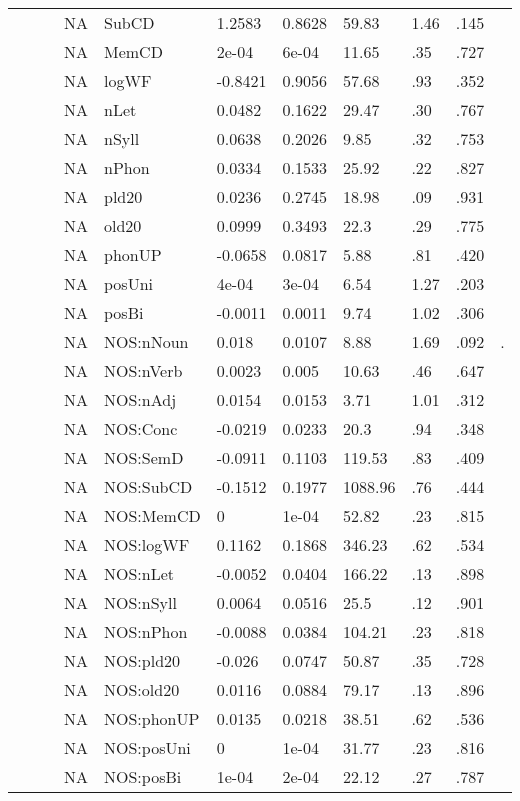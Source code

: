 \begin{table}[ht]
\begin{tabular}{lllllllllll}
   &  &  & NA & SubCD & 1.2583 & 0.8628 & 59.83 & 1.46 & .145 &   \\ 
   &  &  & NA & MemCD & 2e-04 & 6e-04 & 11.65 & .35 & .727 &   \\ 
   &  &  & NA & logWF & -0.8421 & 0.9056 & 57.68 & .93 & .352 &   \\ 
   &  &  & NA & nLet & 0.0482 & 0.1622 & 29.47 & .30 & .767 &   \\ 
   &  &  & NA & nSyll & 0.0638 & 0.2026 & 9.85 & .32 & .753 &   \\ 
   &  &  & NA & nPhon & 0.0334 & 0.1533 & 25.92 & .22 & .827 &   \\ 
   &  &  & NA & pld20 & 0.0236 & 0.2745 & 18.98 & .09 & .931 &   \\ 
   &  &  & NA & old20 & 0.0999 & 0.3493 & 22.3 & .29 & .775 &   \\ 
   &  &  & NA & phonUP & -0.0658 & 0.0817 & 5.88 & .81 & .420 &   \\ 
   &  &  & NA & posUni & 4e-04 & 3e-04 & 6.54 & 1.27 & .203 &   \\ 
   &  &  & NA & posBi & -0.0011 & 0.0011 & 9.74 & 1.02 & .306 &   \\ 
   &  &  & NA & NOS:nNoun & 0.018 & 0.0107 & 8.88 & 1.69 & .092 & . \\ 
   &  &  & NA & NOS:nVerb & 0.0023 & 0.005 & 10.63 & .46 & .647 &   \\ 
   &  &  & NA & NOS:nAdj & 0.0154 & 0.0153 & 3.71 & 1.01 & .312 &   \\ 
   &  &  & NA & NOS:Conc & -0.0219 & 0.0233 & 20.3 & .94 & .348 &   \\ 
   &  &  & NA & NOS:SemD & -0.0911 & 0.1103 & 119.53 & .83 & .409 &   \\ 
   &  &  & NA & NOS:SubCD & -0.1512 & 0.1977 & 1088.96 & .76 & .444 &   \\ 
   &  &  & NA & NOS:MemCD & 0 & 1e-04 & 52.82 & .23 & .815 &   \\ 
   &  &  & NA & NOS:logWF & 0.1162 & 0.1868 & 346.23 & .62 & .534 &   \\ 
   &  &  & NA & NOS:nLet & -0.0052 & 0.0404 & 166.22 & .13 & .898 &   \\ 
   &  &  & NA & NOS:nSyll & 0.0064 & 0.0516 & 25.5 & .12 & .901 &   \\ 
   &  &  & NA & NOS:nPhon & -0.0088 & 0.0384 & 104.21 & .23 & .818 &   \\ 
   &  &  & NA & NOS:pld20 & -0.026 & 0.0747 & 50.87 & .35 & .728 &   \\ 
   &  &  & NA & NOS:old20 & 0.0116 & 0.0884 & 79.17 & .13 & .896 &   \\ 
   &  &  & NA & NOS:phonUP & 0.0135 & 0.0218 & 38.51 & .62 & .536 &   \\ 
   &  &  & NA & NOS:posUni & 0 & 1e-04 & 31.77 & .23 & .816 &   \\ 
   &  &  & NA & NOS:posBi & 1e-04 & 2e-04 & 22.12 & .27 & .787 &   \\ 
   \hline
\end{tabular}
\endgroup
\end{table}
